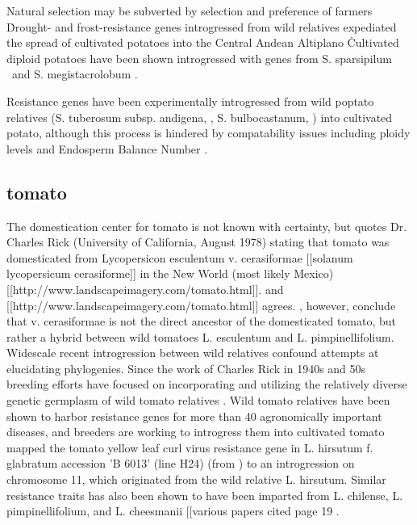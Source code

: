 \documentclass[11pt]{article}
\begin{document}
Natural selection may be subverted by selection and preference of farmers \cite{brush1981dynamics}\.

Drought- and frost-resistance genes introgressed from wild relatives expediated the spread of cultivated potatoes into the Central Andean Altiplano \cite{johns1986ongoing, hawkes1962origin, schmiediche1980breeding}\.

Cultivated diploid potatoes have been shown introgressed with genes from S. sparsipilum \cite{rabinowitz1990high}\ and S. megistacrolobum \cite{johns1987relationships, huaman1980solanum}.

Resistance genes have been experimentally introgressed from wild poptato relatives (S. tuberosum subsp. andigena, \cite{van1999tight}, S. bulbocastanum, \cite{van2003ancient}) into cultivated potato, although this process is hindered by compatability issues including ploidy levels and Endosperm Balance Number \cite{johnston1980significance}.

\subsection*{tomato}

The domestication center for tomato is not known with certainty, but \cite{sims1979history} quotes Dr. Charles Rick (University of California, August 1978) stating that tomato was domesticated from Lycopersicon esculentum v. cerasiformae [[solanum lycopersicum cerasiforme]] in the New World (most likely Mexico) [[http://www.landscapeimagery.com/tomato.html]].
\cite{robertson2007genetic, bai2007domestication} and [[http://www.landscapeimagery.com/tomato.html]] agrees.
\cite{nesbitt2002comparative}, however, conclude that v. cerasiformae is not the direct ancestor of the domesticated tomato, but rather a hybrid between wild tomatoes L. esculentum and L. pimpinellifolium.
Widescale recent introgression between wild relatives confound attempts at elucidating phylogenies.
Since the work of Charles Rick in 1940s and 50s \cite{rick1953novel}\, breeding efforts have focused on incorporating and utilizing the relatively diverse genetic germplasm of wild tomato relatives \cite{rick1988tomato} \cite{miller1990rflp, rick1982potential}.
Wild tomato relatives have been shown to harbor resistance genes for more than 40 agronomically important diseases, and breeders are working to introgress them into cultivated tomato \cite{rick1995utilization}\.
\cite{hanson2000mapping} mapped the tomato yellow leaf curl virus resistance gene in L. hirsutum f. glabratum accession 'B 6013' (line H24) (from \cite{banerjee1990transfer}) to an introgression on chromosome 11, which originated from the wild relative L. hirsutum.
Similar resistance traits has also been shown to have been imparted from L. chilense, L. pimpinellifolium, and L. cheesmanii [[various papers cited page 19 \cite{hanson2000mapping}\).
\end{document}
